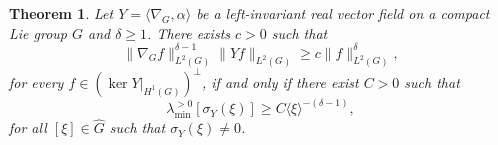 \documentclass[11pt]{amsart}
\newtheorem{theorem}{Theorem}
\numberwithin{theorem}{section}
\numberwithin{equation}{section}
\theoremstyle{definition}
\numberwithin{example}{section}
\theoremstyle{definition}
\theoremstyle{definition}
\begin{document}
\begin{theorem}\label{theo_directional_poincare_general}
    Let $Y=\langle \nabla_{G},\alpha\rangle$ be a left-invariant real vector field on a compact Lie group $G$ and $\delta\geq 1$. There exists $c>0$ such that 
\begin{equation}\label{ineq_poincare_nec_suf}
        \|\nabla_{G} f\|_{L^2(G)}^{\delta-1}\| Yf\|_{L^2(G)}\geq c\|f\|_{L^2(G)}^\delta,
    \end{equation}
    for every $f\in (\ker Y|_{H^1(G)})^\perp$, if and only if there exist $C>0$ such that
\begin{equation}\label{ineq_min_sin_nonzero_general_poincare}
        \lambda_{\min}^{>0}[\sigma_Y(\xi)]\geq C\langle \xi \rangle^{-(\delta-1)},
    \end{equation}
    for all $[\xi]\in\widehat{G}$ such that $\sigma_Y(\xi)\neq 0$. 
\end{theorem}
\end{document}

